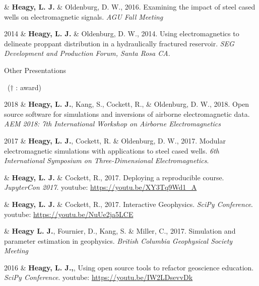 \documentclass[a4paper, 11pt]{article}
\newcommand{\youtube}[1]{youtube: \href{https://youtu.be/XY3Tq9Wd1\_A}{#1}}
\newcommand{\subheading}[1]{
    \vspace{0.4cm}
    {\Large #1}\\
    \vspace{-0.2cm}
}
\begin{document}
\begin{entryright}
& \textbf{Heagy, L. J.} \& Oldenburg, D. W., 2016. Examining the impact of steel cased wells on electromagnetic signals. \emph{AGU Fall Meeting}
\end{entryright}


\begin{entryright}
2014 & \textbf{Heagy, L. J.} \& Oldenburg, D. W., 2014. Using electromagnetics to delineate proppant distribution in a hydraulically fractured reservoir. \emph{SEG Development and Production Forum, Santa Rosa CA}.
\end{entryright}

\subheading{Other Presentations}
\vspace{0.3cm}
~($\dagger$ : award)
\vspace{0.3cm}
\begin{entryright}
2018 & \textbf{Heagy, L. J.}, Kang, S., Cockett, R., \& Oldenburg, D. W., 2018. Open source software for simulations and inversions of airborne electromagnetic data. \emph{AEM 2018: 7th International Workshop on Airborne Electromagnetics}
\end{entryright}

\begin{entryright}
2017 & \textbf{Heagy, L. J.}, Cockett, R. \& Oldenburg, D. W., 2017. Modular electromagnetic simulations with applications to steel cased wells. \emph{6th International Symposium on Three-Dimensional Electromagnetics}.
\end{entryright}

\begin{entryright}
& \textbf{Heagy, L. J.} \& Cockett, R., 2017. Deploying a reproducible course. \emph{JupyterCon 2017}. \youtube{https://youtu.be/XY3Tq9Wd1\_A}
\end{entryright}

\begin{entryright}
& \textbf{Heagy, L. J.} \& Cockett, R., 2017. Interactive Geophysics. \emph{SciPy Conference}. \youtube{https://youtu.be/NuUe2ja5LCE}
\end{entryright}

\begin{entryright}
& \textbf{Heagy L. J.}, Fournier, D., Kang, S. \& Miller, C., 2017. Simulation and parameter estimation in geophysics. \emph{British Columbia Geophysical Society Meeting}
\end{entryright}

\begin{entryright}
2016 & \textbf{Heagy, L. J.,},  Using open source tools to refactor geoscience education. \emph{SciPy Conference}. \youtube{https://youtu.be/IW2LDsevvDk}
\end{entryright}
\end{document}
